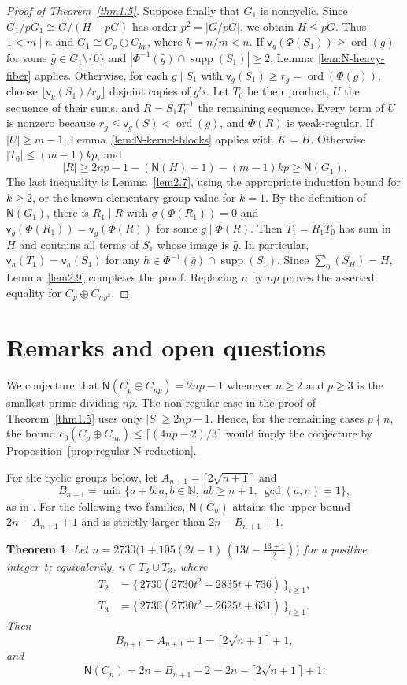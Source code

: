 \documentclass[10pt,a4paper]{amsart}
\newtheorem{thm}{Theorem} [section]
\theoremstyle{definition}
\theoremstyle{remark}
\numberwithin{equation}{section}
\newcommand{\N}{\mathbb N}
\DeclareMathOperator{\ord}{ord}
\DeclareMathOperator{\supp}{supp}
\begin{document}
\begin{proof}[Proof of Theorem~\ref{thm1.5}]
Suppose finally that $G_1$ is noncyclic.
Since $G_1/pG_1\cong G/(H+pG)$ has order $p^2=|G/pG|$,
we obtain $H\le pG$.
Thus $1<m\mid n$ and $G_1\cong C_p\oplus C_{kp}$, where $k=n/m<n$.
If $\mathsf v_{\bar g}(\Phi(S_1))\ge\ord(\bar g)$ for some
$\bar g\in G_1\setminus\{0\}$ and
$|\Phi^{-1}(\bar g)\cap\supp(S_1)|\ge2$,
Lemma~\ref{lem:N-heavy-fiber} applies.
Otherwise, for each $g\mid S_1$ with
$\mathsf v_g(S_1)\ge r_g=\ord(\Phi(g))$, choose $\lfloor\mathsf v_g(S_1)/r_g\rfloor$ disjoint copies of
$g^{r_g}$.
Let $T_0$ be their product, $U$ the sequence of their sums,
and $R=S_1T_0^{-1}$ the remaining sequence.
Every term of $U$ is nonzero because $r_g\le\mathsf v_g(S)<\ord(g)$,
and $\Phi(R)$ is weak-regular.
If $|U|\ge m-1$, Lemma~\ref{lem:N-kernel-blocks} applies with $K=H$.
Otherwise $|T_0|\le(m-1)kp$, and
\[
 |R|\ge2np-1-(\mathsf N(H)-1)-(m-1)kp\ge\mathsf N(G_1).
\]
The last inequality is Lemma~\ref{lem2.7}, using the appropriate induction
bound for $k\ge2$, or the known elementary-group value for $k=1$.
By the definition of $\mathsf N(G_1)$, there is $R_1\mid R$ with
$\sigma(\Phi(R_1))=0$ and
$\mathsf v_{\bar g}(\Phi(R_1))=\mathsf v_{\bar g}(\Phi(R))$
for some $\bar g\mid\Phi(R)$.
Then $T_1=R_1T_0$ has sum in $H$ and contains all terms of $S_1$
whose image is $\bar g$. In particular,
$\mathsf v_h(T_1)=\mathsf v_h(S_1)$ for any
$h\in\Phi^{-1}(\bar g)\cap\supp(S_1)$.
Since $\sum_0(S_H)=H$, Lemma~\ref{lem2.9} completes the proof.
Replacing $n$ by $np$ proves the asserted equality for $C_p\oplus C_{np^2}$.
\end{proof}

\section{Remarks and open questions}
We conjecture that $\mathsf N(C_p\oplus C_{np})=2np-1$ whenever
$n\ge2$ and $p\ge3$ is the smallest prime dividing $np$.
The non-regular case in the proof of Theorem~\ref{thm1.5} uses only
$|S|\ge2np-1$. Hence, for the remaining cases $p\nmid n$, the bound
$c_0(C_p\oplus C_{np})\le\lceil(4np-2)/3\rceil$ would imply the
conjecture by Proposition~\ref{prop:regular-N-reduction}.

For the cyclic groups below, let $A_{n+1}=\lceil2\sqrt{n+1}\rceil$ and
\[
B_{n+1}=\min\{a+b: a,b\in\N,\ ab\ge n+1,\ \gcd(a,n)=1\},
\]
as in \cite{[JY2024]}.
For the following two families, $\mathsf N(C_n)$ attains the upper bound
$2n-A_{n+1}+1$ and is strictly larger than $2n-B_{n+1}+1$.

\begin{thm}\label{thm5.3}
	Let $n=2730\bigl(1+105(2t-1)\,(13t-\tfrac{13\pm 1}{2})\bigr)$ for a positive integer~$t$;
	equivalently, $n\in T_2\cup T_3$, where
	\begin{align*}
	T_2 &= \{\,2730(2730t^2-2835t+736)\,\}_{t\ge 1},\\
	T_3 &= \{\,2730(2730t^2-2625t+631)\,\}_{t\ge 1}.
	\end{align*}
	Then
	\[
	B_{n+1}=A_{n+1}+1=\lceil 2\sqrt{n+1}\rceil+1,
	\]
	and
	\[
	\mathsf{N}(C_n)=2n-B_{n+1}+2=2n-\lceil 2\sqrt{n+1}\rceil+1.
	\]
\end{thm}
\end{document}
